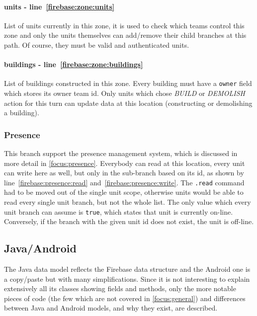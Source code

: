 				\paragraph{units - line~\ref{firebase:zone:units}}
				List of units currently in this zone, it is used to check which teams control this zone and only the units themselves can add/remove their child branches at this path. Of course, they must be valid and authenticated units.
				
				\paragraph{buildings - line~\ref{firebase:zone:buildings}}
				List of buildings constructed in this zone. Every building must have a \lstinline|owner| field which stores its owner team id. Only units which chose \emph{BUILD} or \emph{DEMOLISH} action for this turn can update data at this location (constructing or demolishing a building).
			
			\newpage
			
			\subsubsection{Presence}\label{model:presence}
		
				
									
				This branch support the presence management system, which is discussed in more detail in \autoref{focus:presence}.
				Everybody can read at this location, every unit can write here as well, but only in the sub-branch based on its id, as shown by line~\ref{firebase:presence:read} and~\ref{firebase:presence:write}.
				The \lstinline|.read| command had to be moved out of the single unit scope, otherwise units would be able to read every single unit branch, but not the whole list.
				The only value which every unit branch can assume is \lstinline|true|, which states that unit is currently on-line. Conversely, if the branch with the given unit id does not exist, the unit is off-line. \\
			
		\subsection{Java/Android}
			
			The Java data model reflects the Firebase data structure and the Android one is a copy/paste but with many simplifications. Since it is not interesting to explain extensively all its classes showing fields and methods, only the more notable pieces of code (the few which are not covered in \autoref{focus:general}) and differences between Java and Android models, and why they exist, are described.
			
